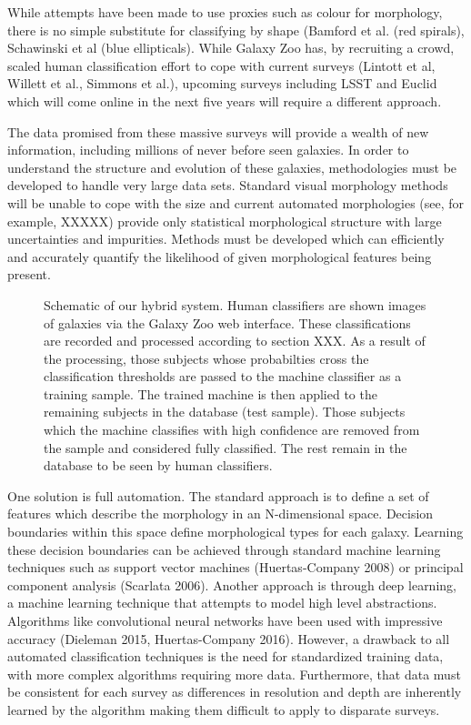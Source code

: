 \documentclass[twocolumn]{aastex6}
\begin{document}
While attempts have been made to use proxies such as colour for morphology, there is no simple substitute for classifying by shape (Bamford et al. (red spirals), Schawinski et al (blue ellipticals). While Galaxy Zoo has, by recruiting a crowd, scaled human classification effort to cope with current surveys (Lintott et al, Willett et al., Simmons et al.), upcoming surveys including LSST and Euclid which will come online in the next five years will require a different approach.


The data promised from these massive surveys will provide a wealth of new information, 
including millions of never before seen galaxies. In order to understand the structure and
evolution of these galaxies, methodologies must be developed to handle very large data sets. Standard visual morphology methods will be unable to cope with
the size and current automated morphologies (see, for example, XXXXX) provide only statistical morphological structure with large uncertainties and impurities. Methods must be developed which can efficiently and accurately quantify the likelihood of given morphological features being present.

\begin{figure}[ht!]
\caption{Schematic of our hybrid system. Human classifiers are shown images of galaxies via the Galaxy Zoo web interface. These  classifications are recorded and processed according to section XXX. As a result of the processing, those subjects whose probabilties cross the classification thresholds are passed to the machine classifier as a training sample. The trained machine is then applied to the remaining subjects in the database (test sample). Those subjects which the machine classifies with high confidence are removed from the sample and considered fully classified. The rest remain in the database to be seen by human classifiers. \label{fig: schematic}}
\end{figure}

One solution is full automation. The standard approach is to define a set of features which describe the morphology in an N-dimensional space. Decision boundaries within this space define morphological types for each galaxy. Learning these decision boundaries can be achieved through standard machine learning techniques such as support vector machines (Huertas-Company 2008) or principal component analysis (Scarlata 2006).  Another approach is through deep learning, a machine learning technique that attempts to model high level abstractions. Algorithms like convolutional neural networks have been used with impressive accuracy (Dieleman 2015, Huertas-Company 2016). However, a drawback to all automated classification techniques is the need for standardized training data, with more complex algorithms requiring more data. Furthermore, that data must be consistent for each survey as differences in resolution and depth are inherently learned by the algorithm making them difficult to apply to disparate surveys. 
\end{document}
